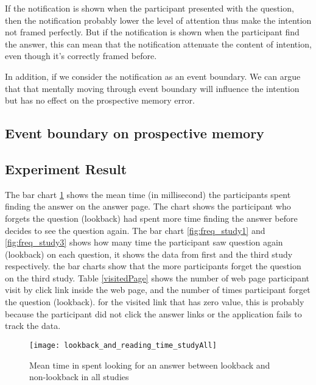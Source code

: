 If the notification is shown when the participant presented with the question,
 then the notification probably lower the level of attention thus make the intention not framed perfectly.
But if the notification is shown when the participant find the answer, this can mean that the notification attenuate the content of intention,
even though it's correctly framed before.

In addition, if we consider the notification as an event boundary. We can argue that
that mentally moving through event boundary will influence the intention but has no effect on the prospective memory error.

\subsection{Event boundary on prospective memory}
\subsection{Experiment Result}
The bar chart \ref{fig:lookingAnswer_lookback} shows the mean time (in millisecond) the participants spent finding the answer on the answer page.
The chart shows the participant who forgets the question (lookback) had spent more time finding the answer before decides to see the question again.
The bar chart \ref{fig:freq_study1} and \ref{fig:freq_study3} shows how many time the participant saw question again (lookback) on each question, it shows the data from first and the third study respectively.
the bar charts show that the more participants forget the question on the third study.
Table \ref{visitedPage} shows the number of web page participant visit by click link inside the web page, and the number of times participant forget the question (lookback).
for the visited link that has zero value, this is probably because the participant did not click the answer links or the application fails to track the data.
\begin{figure}[!h]
\begin{center}
\texttt{[image: lookback\_and\_reading\_time\_studyAll]}
\end{center}
\captionsetup{justification=centering}
\caption{Mean time in spent looking for an answer between lookback and non-lookback in all studies}
\label{fig:lookingAnswer_lookback}
\end{figure}

